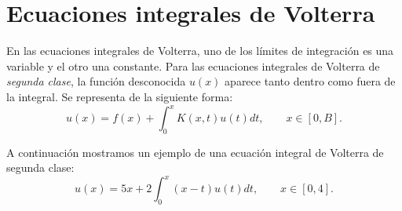 \section{Ecuaciones integrales de Volterra}
En las ecuaciones integrales de Volterra, uno de los límites de integración es una variable y el otro una constante. Para las ecuaciones integrales de Volterra de \textit{segunda clase}, la función desconocida $u(x)$ aparece tanto dentro como fuera de la integral. Se representa de la siguiente forma:
\begin{equation}\label{eq:volterra}
	u(x) = f(x) + \int_0^x K(x,t)u(t)dt, \qquad x \in [0,B].
\end{equation}
\begin{ejemplo}
	A continuación mostramos un ejemplo de una ecuación integral de Volterra de segunda clase:
	\begin{equation}\label{}
		u(x) = 5x + 2\int_0^x (x-t)u(t)dt, \qquad x \in [0,4].
	\end{equation}	
\end{ejemplo}
